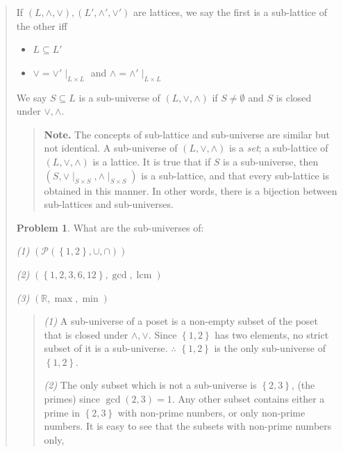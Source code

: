 \documentclass[a4paper, 12pt]{article}
\theoremstyle{definition}
\newtheorem{problem}{Problem}
\theoremstyle{definition}
\theoremstyle{definition}
\DeclareMathOperator{\lcm}{lcm}
\begin{document}
\begin{quote}
If $(L, \land, \lor), (L', \land', \lor')$ are lattices, we say the first is a
sub-lattice of the other iff 

\begin{itemize}
    \item $L \subseteq L'$
    \item $\lor = \lor'\mid_{L \times L}$ and $\land = \land'\mid_{L \times L}$
\end{itemize}

We say $S \subseteq L$ is a sub-universe of $(L, \lor, \land)$ if $S \neq
\emptyset$ and $S$ is closed under $\lor, \land$.


\small
\begin{quote}

\textbf{Note.} The concepts of sub-lattice and sub-universe are similar but not
identical. A sub-universe of $(L, \lor, \land)$ is a \textit{set}; a sub-lattice
of $(L, \lor, \land)$ is a lattice. It is true that if $S$ is a sub-universe,
then $(S, \lor \mid_{S \times S}, \land \mid_{S \times S})$ is a sub-lattice,
and that every sub-lattice is obtained in this manner. In other words, there is
a bijection between sub-lattices and sub-universes. 


\end{quote}
\normalsize

\begin{problem}
    What are the sub-universes of:

    \textit{(1)} $\left( \mathcal{P}(\left\{ 1,2
    \right\}, \cup, \cap ) \right) $ 

    \textit{(2)} $\left( \left\{ 1, 2, 3, 6,
    12 \right\}, \gcd, \lcm  \right) $

    \textit{(3)} $\left( \mathbb{R}, \max, \min \right) $
\end{problem}


\small
\begin{quote}

    \textit{(1)} A sub-universe of a poset is a non-empty subset of the poset
    that is closed under $\land , \lor $. Since $\left\{ 1, 2 \right\} $ has
    two elements, no strict subset of it is a sub-universe. $\therefore $
    $\left\{ 1, 2 \right\} $ is the only sub-universe of $\left\{ 1, 2 \right\}
    $.

    \textit{(2)} The only subset which is not a sub-universe is $\left\{ 2, 3 \right\} $,
    (the primes) since $\gcd(2, 3) = 1$. Any other subset contains 
    either a prime in $\left\{ 2, 3 \right\} $ with non-prime numbers,
    or only non-prime numbers. It is easy to see that the subsets
    with non-prime numbers only,


\end{quote}
\end{quote}
\end{document}
